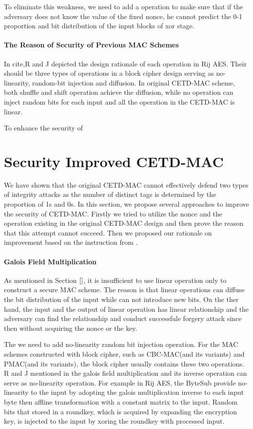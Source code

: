 \documentclass{article}
\begin{document}
To eliminate this weakness, we need to add a operation to make sure that if the adversary does not know the value of the fixed nonce, he cannot predict the 0-1 proportion  and bit distribution of the input blocks of xor stage. 
\paragraph{The Reason of Security of Previous MAC Schemes}
In cite{},R and J depicted the design rationale of each operation in Rij AES. Their should be three types of operations in a block cipher design serving as no-linearity, random-bit injection and diffusion.  
In original CETD-MAC scheme, both shuffle and shift operation achieve the diffusion, while no operation can inject random bits for each input and all the operation in the CETD-MAC is linear.  

To enhance the security of 
\section{Security Improved CETD-MAC}
We have shown that the original CETD-MAC cannot effectively defend two types of integrity attacks as the number of distinct tags is determined by the proportion of 1s and 0s. In this section, we propose several approaches to improve the security of CETD-MAC. Firstly we tried to utilize the nonce and the operation existing in the original CETD-MAC design and then prove the reason that this attempt cannot succeed. Then we proposed our rationale on improvement based on the instruction from \cite{}.  
\paragraph{Galois Field Multiplication}
As mentioned in Section $\ref{}$, it is insufficient to use linear operation
only to construct a secure MAC scheme. The reason is that linear operations can
diffuse the bit distribution of the input while can not introduce new bits. On
the ther hand, the input and the output of linear operation has linear
relationship and the adversary can find the relationship and conduct successfule
forgery attack since then without acquiring the nonce or the key.

The we need to add no-linearity random bit injection operation. For the MAC
schemes constructed with block cipher, such as CBC-MAC(and its variants) and
PMAC(and its variants), the block cipher usually contains these two operations.
R and J mentioned in \cite{} the galois field multiplication and its inverse
operation can serve as no-linearity operation. 
For example in Rij AES, the ByteSub provide no-linearity to the input by
adopting the galois multiplication inverse to each input byte then affline
transformation with a constant matrix to the input. Random bits that stored in a
roundkey, which is acquired by expanding the encryption key, is injected to the
input by xoring the roundkey with processed input.  
\end{document}
